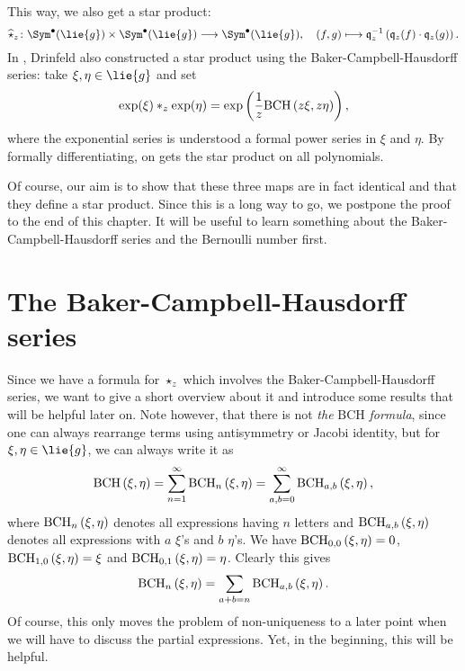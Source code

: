 This way, we also get a star product:
\begin{equation}
	\label{Alg:DeformedStar}
	\widehat{\star}_z
	\colon
	\Sym^{\bullet}(\lie{g})
	\times
	\Sym^{\bullet}(\lie{g})
	\longrightarrow
	\Sym^{\bullet}(\lie{g})
	, \quad
	(f,g)
	\longmapsto
	\mathfrak{q}_z^{-1} 
	\left(
		\mathfrak{q}_z(f) \cdot \mathfrak{q}_z(g)
	\right).
\end{equation}
In \cite{drinfeld:1983a}, Drinfeld also constructed a star product using the 
Baker-Campbell-Hausdorff series: take $\xi, \eta \in \lie{g}$ and set
\begin{equation}
	\label{Alg:DrinfeldStar}
	\exp(\xi) \ast_z \exp(\eta)
	=
	\exp \left(
		\frac{1}{z}
		\mathrm{BCH}\left(z \xi, z \eta\right)
	\right),
\end{equation}
where the exponential series is understood a formal power series in $\xi$ 
and $\eta$. By formally differentiating, on gets the star product on all 
polynomials.


Of course, our aim is to show that these three maps are in fact identical 
and that they define a star product. Since this is a long way to go, we 
postpone the proof to the end of this chapter. It will be useful to learn 
something about the Baker-Campbell-Hausdorff series and the Bernoulli number 
first.



\section{The Baker-Campbell-Hausdorff series}
\label{sec:chap3_BCH}

Since we have a formula for $\star_z$ which involves the
Baker-Campbell-Hausdorff series, we want to give a short overview
about it and introduce some results that will be helpful later on.
Note however, that there is not \emph{the} BCH \emph{formula}, since one 
can always rearrange terms using antisymmetry or Jacobi identity, but for 
$\xi, \eta \in \lie{g}$, we can always write it as
\begin{equation}
	\label{Alg:NamesOfBCH}
	\mathrm{BCH}\left(\xi, \eta\right)
	=
	\sum\limits_{n = 1}^{\infty}
	\mathrm{BCH}_{n}\left(\xi, \eta\right)
	=
	\sum\limits_{a,b = 0}^{\infty}
	\mathrm{BCH}_{a, b}\left(\xi, \eta\right),
\end{equation}
where $\mathrm{BCH}_{n}\left(\xi, \eta\right)$ denotes all expressions having $n$ letters 
and $\mathrm{BCH}_{a, b}\left(\xi, \eta\right)$ denotes all expressions with $a$ $\xi$'s 
and $b$ $\eta$'s. We have $\mathrm{BCH}_{0, 0}\left(\xi, \eta\right) = 0$, $\mathrm{BCH}_{1, 0}\left(\xi, \eta\right) = \xi$ and $\mathrm{BCH}_{0, 1}\left(\xi, \eta\right) = \eta$. Clearly this 
gives
\begin{equation*}
	\mathrm{BCH}_{n}\left(\xi, \eta\right)
	=
	\sum\limits_{a + b = n}
	\mathrm{BCH}_{a, b}\left(\xi, \eta\right).
\end{equation*}
Of course, this only moves the problem of non-uniqueness to a later point 
when we will have to discuss the partial expressions. Yet, in the beginning, 
this will be helpful.



